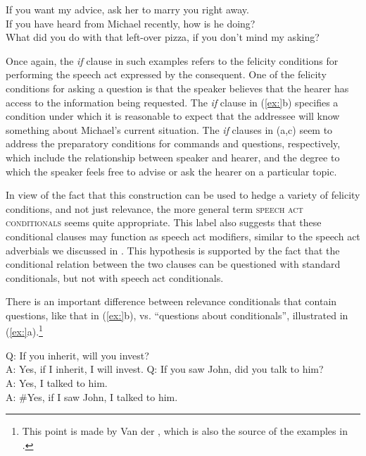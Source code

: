 \ea
\ea If you want my advice, ask her to marry you right away.\\
\ex If you have heard from Michael recently, how is he doing?\\
\ex What did you do with that left-over pizza, if you don’t mind my asking?
                       \z
\z


Once again, the \textit{if} clause in such examples refers to the felicity conditions for performing the speech act expressed by the consequent. One of the felicity conditions for asking a question is that the speaker believes that the hearer has access to the information being requested. The \textit{if} clause in (\ref{ex:}b) specifies a condition under which it is reasonable to expect that the addressee will know something about Michael’s current situation. The \textit{if} clauses in (a,c) seem to address the preparatory conditions for commands and questions, respectively, which include the relationship between speaker and hearer, and the degree to which the speaker feels free to advise or ask the hearer on a particular topic.



In view of the fact that this construction can be used to hedge a variety of felicity conditions, and not just relevance, the more general term \textsc{speech act conditionals} seems quite appropriate. This label also suggests that these conditional clauses may function as speech act modifiers, similar to the speech act adverbials we discussed in . This hypothesis is supported by the fact that the conditional relation between the two clauses can be questioned with standard conditionals, but not with speech act conditionals.



There is an important difference between relevance conditionals that contain questions, like that in (\ref{ex:}b), vs. “questions about conditionals”, illustrated in (\ref{ex:}a).\footnote{This point is made by Van der \citet{Auwera1986}, which is also the source of the examples in .}


\ea
\ea  Q: If you inherit, will you invest?\\
A: Yes, if I inherit, I will invest.
\ex  Q: If you saw John, did you talk to him?\\
A: Yes, I talked to him.\\
A: \#Yes, if I saw John, I talked to him.
\z \z



